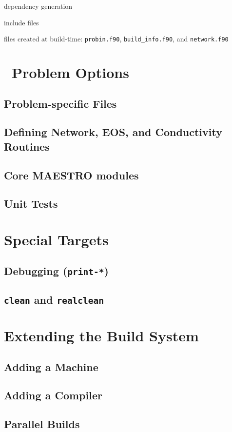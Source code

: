 dependency generation

include files

files created at build-time: {\tt probin.f90}, {\tt build\_info.f90}, and {\tt network.f90}


\section{\maestro\ Problem Options}

\subsection{Problem-specific Files}

\subsection{Defining Network, EOS, and Conductivity Routines}

\subsection{Core MAESTRO modules}

\subsection{Unit Tests}


\section{Special Targets}

\subsection{Debugging ({\tt print-*})}

\subsection{{\tt clean} and {\tt realclean}}



\section{Extending the Build System}

\subsection{Adding a Machine}

\subsection{Adding a Compiler}

\subsection{Parallel Builds}





